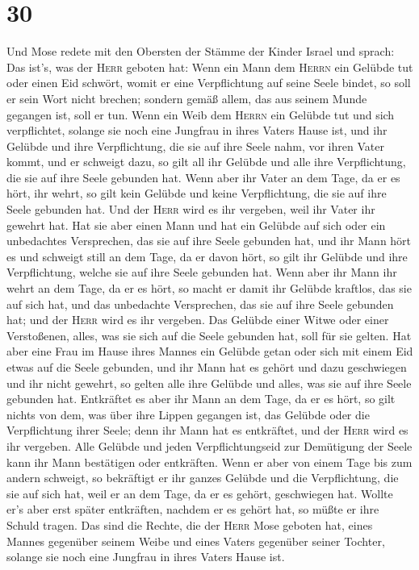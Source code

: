 \hypertarget{section-29}{%
\section{30}\label{section-29}}

 Und Mose redete mit den Obersten der Stämme der Kinder
Israel und sprach: Das ist's, was der \textsc{Herr} geboten hat:
 Wenn ein Mann dem \textsc{Herrn} ein Gelübde tut oder
einen Eid schwört, womit er eine Verpflichtung auf seine Seele bindet,
so soll er sein Wort nicht brechen; sondern gemäß allem, das aus seinem
Munde gegangen ist, soll er tun.  Wenn ein Weib dem
\textsc{Herrn} ein Gelübde tut und sich verpflichtet, solange sie noch
eine Jungfrau in ihres Vaters Hause ist,  und ihr Gelübde
und ihre Verpflichtung, die sie auf ihre Seele nahm, vor ihren Vater
kommt, und er schweigt dazu, so gilt all ihr Gelübde und alle ihre
Verpflichtung, die sie auf ihre Seele gebunden hat.  Wenn
aber ihr Vater an dem Tage, da er es hört, ihr wehrt, so gilt kein
Gelübde und keine Verpflichtung, die sie auf ihre Seele gebunden hat.
Und der \textsc{Herr} wird es ihr vergeben, weil ihr Vater ihr gewehrt
hat.  Hat sie aber einen Mann und hat ein Gelübde auf sich
oder ein unbedachtes Versprechen, das sie auf ihre Seele gebunden hat,
 und ihr Mann hört es und schweigt still an dem Tage, da
er davon hört, so gilt ihr Gelübde und ihre Verpflichtung, welche sie
auf ihre Seele gebunden hat.  Wenn aber ihr Mann ihr wehrt
an dem Tage, da er es hört, so macht er damit ihr Gelübde kraftlos, das
sie auf sich hat, und das unbedachte Versprechen, das sie auf ihre Seele
gebunden hat; und der \textsc{Herr} wird es ihr vergeben. 
Das Gelübde einer Witwe oder einer Verstoßenen, alles, was sie sich auf
die Seele gebunden hat, soll für sie gelten.  Hat aber
eine Frau im Hause ihres Mannes ein Gelübde getan oder sich mit einem
Eid etwas auf die Seele gebunden,  und ihr Mann hat es
gehört und dazu geschwiegen und ihr nicht gewehrt, so gelten alle ihre
Gelübde und alles, was sie auf ihre Seele gebunden hat. 
Entkräftet es aber ihr Mann an dem Tage, da er es hört, so gilt nichts
von dem, was über ihre Lippen gegangen ist, das Gelübde oder die
Verpflichtung ihrer Seele; denn ihr Mann hat es entkräftet, und der
\textsc{Herr} wird es ihr vergeben.  Alle Gelübde und
jeden Verpflichtungseid zur Demütigung der Seele kann ihr Mann
bestätigen oder entkräften.  Wenn er aber von einem Tage
bis zum andern schweigt, so bekräftigt er ihr ganzes Gelübde und die
Verpflichtung, die sie auf sich hat, weil er an dem Tage, da er es
gehört, geschwiegen hat.  Wollte er's aber erst später
entkräften, nachdem er es gehört hat, so müßte er ihre Schuld tragen.
 Das sind die Rechte, die der \textsc{Herr} Mose geboten
hat, eines Mannes gegenüber seinem Weibe und eines Vaters gegenüber
seiner Tochter, solange sie noch eine Jungfrau in ihres Vaters Hause
ist.

